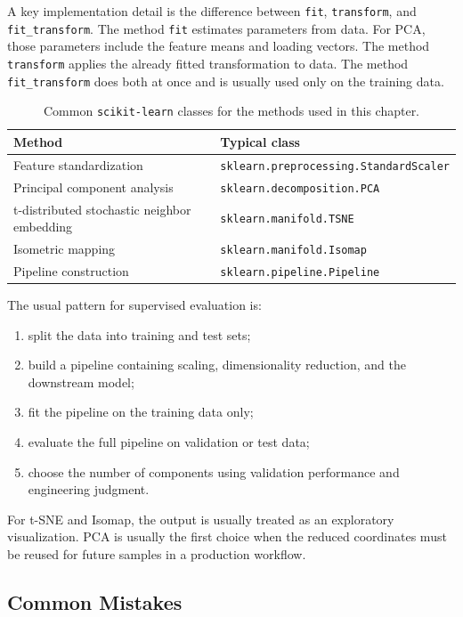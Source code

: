 \documentclass[12pt,letter]{article}
\begin{document}
A key implementation detail is the difference between \texttt{fit}, \texttt{transform}, and \texttt{fit\_transform}. The method \texttt{fit} estimates parameters from data. For PCA, those parameters include the feature means and loading vectors. The method \texttt{transform} applies the already fitted transformation to data. The method \texttt{fit\_transform} does both at once and is usually used only on the training data.

\begin{table}[H]
\centering
\caption{Common \texttt{scikit-learn} classes for the methods used in this chapter.}
\label{tab:dimred_sklearn_classes}
\begin{tabular}{p{}p{}}
\toprule
Method & Typical class \\
\midrule
Feature standardization & \texttt{sklearn.preprocessing.StandardScaler} \\
Principal component analysis & \texttt{sklearn.decomposition.PCA} \\
t-distributed stochastic neighbor embedding & \texttt{sklearn.manifold.TSNE} \\
Isometric mapping & \texttt{sklearn.manifold.Isomap} \\
Pipeline construction & \texttt{sklearn.pipeline.Pipeline} \\
\bottomrule
\end{tabular}
\end{table}

The usual pattern for supervised evaluation is:
\begin{enumerate}[itemsep=0.25ex]
    \item split the data into training and test sets;
    \item build a pipeline containing scaling, dimensionality reduction, and the downstream model;
    \item fit the pipeline on the training data only;
    \item evaluate the full pipeline on validation or test data;
    \item choose the number of components using validation performance and engineering judgment.
\end{enumerate}

For t-SNE and Isomap, the output is usually treated as an exploratory visualization. PCA is usually the first choice when the reduced coordinates must be reused for future samples in a production workflow.

\subsection{Common Mistakes}
\end{document}
